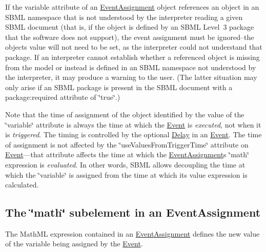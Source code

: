 If the variable attribute of an \hyperlink{class_event_assignment}{Event\+Assignment} object references an object in an S\+B\+ML namespace that is not understood by the interpreter reading a given S\+B\+ML document (that is, if the object is defined by an S\+B\+ML Level~3 package that the software does not support), the event assignment must be ignored--the object\textquotesingle{}s value will not need to be set, as the interpreter could not understand that package. If an interpreter cannot establish whether a referenced object is missing from the model or instead is defined in an S\+B\+ML namespace not understood by the interpreter, it may produce a warning to the user. (The latter situation may only arise if an S\+B\+ML package is present in the S\+B\+ML document with a package\+:required attribute of \char`\"{}true\char`\"{}.)

Note that the time of assignment of the object identified by the value of the \char`\"{}variable\char`\"{} attribute is always the time at which the \hyperlink{class_event}{Event} is {\itshape executed}, not when it is {\itshape triggered}. The timing is controlled by the optional \hyperlink{class_delay}{Delay} in an \hyperlink{class_event}{Event}. The time of assignment is not affected by the \char`\"{}use\+Values\+From\+Trigger\+Time\char`\"{} attribute on \hyperlink{class_event}{Event}---that attribute affects the time at which the \hyperlink{class_event_assignment}{Event\+Assignment}\textquotesingle{}s \char`\"{}math\char`\"{} expression is {\itshape evaluated}. In other words, S\+B\+ML allows decoupling the time at which the \char`\"{}variable\char`\"{} is assigned from the time at which its value expression is calculated.\hypertarget{class_event_assignment_event-math}{}\subsection{The \char`\"{}math\char`\"{} subelement in an Event\+Assignment}\label{class_event_assignment_event-math}
The Math\+ML expression contained in an \hyperlink{class_event_assignment}{Event\+Assignment} defines the new value of the variable being assigned by the \hyperlink{class_event}{Event}.


